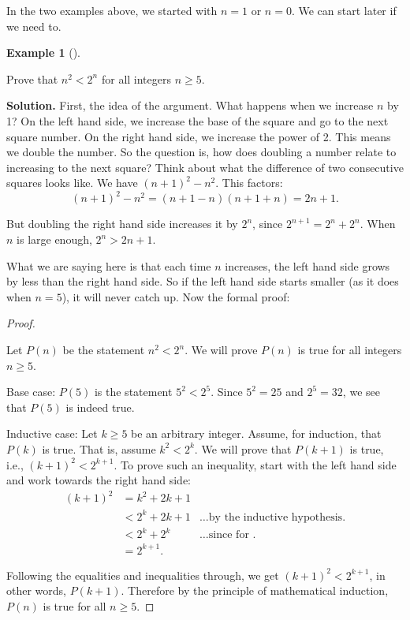 \documentclass[10pt,]{book}
\theoremstyle{plain}
\theoremstyle{definition}
\newtheorem{example}[theorem]{Example}
\theoremstyle{definition}
\theoremstyle{definition}
\numberwithin{equation}{chapter}
\newcommand{\lt}{ < }
\newcommand{\amp}{ & }
\begin{document}
In the two examples above, we started with \(n = 1\) or \(n = 0\). We can start later if we need to.
%
\begin{example}[]\label{example-81}

Prove that \(n^2 \lt  2^n\) for all integers \(n \ge 5\).
%
\par\medskip\noindent%
\textbf{Solution.}\quad
First, the idea of the argument. What happens when we increase \(n\) by 1? On the left hand side, we increase the base of the square and go to the next square number. On the right hand side, we increase the power of 2. This means we double the number. So the question is, how does doubling a number relate to increasing to the next square? Think about what the difference of two consecutive squares looks like. We have \((n+1)^2 - n^2\). This factors:
\begin{equation*}
  (n+1)^2 - n^2 = (n+1-n)(n+1+n) = 2n+1.
\end{equation*}
%
\par

But doubling the right hand side increases it by \(2^n\), since \(2^{n+1} = 2^n + 2^n\). When \(n\) is large enough, \(2^n > 2n + 1\).
%
\par

What we are saying here is that each time \(n\) increases, the left hand side grows by less than the right hand side. So if the left hand side starts smaller (as it does when \(n = 5\)), it will never catch up. Now the formal proof:
%
\begin{proof}\hypertarget{proof-16}{}

Let \(P(n)\) be the statement \(n^2 \lt  2^n\).
We will prove \(P(n)\) is true for all integers \(n \ge 5\).
%
\par

Base case: \(P(5)\) is the statement \(5^2 \lt  2^5\). Since \(5^2 = 25\) and \(2^5 = 32\), we see that \(P(5)\) is indeed true.
%
\par

Inductive case: Let \(k \ge 5\) be an arbitrary integer. Assume, for induction, that \(P(k)\) is true. That is, assume \(k^2 \lt  2^k\). We will prove that \(P(k+1)\) is true, i.e., \((k+1)^2 \lt  2^{k+1}\). To prove such an inequality, start with the left hand side and work towards the right hand side:
\begin{align*}
  (k+1)^2 \amp  = k^2 + 2k + 1 \amp\\
  \amp  \lt  2^k + 2k + 1 \amp \mbox{\ldots by the inductive hypothesis.}\\
  \amp  \lt  2^k + 2^k  \amp \mbox{\ldots since  for .}\\
  \amp  = 2^{k+1}. \amp
\end{align*}
%
\par

Following the equalities and inequalities through, we get \((k+1)^2 \lt  2^{k+1}\), in other words, \(P(k+1)\). Therefore by the principle of mathematical induction, \(P(n)\) is true for all \(n \ge 5\).
%
\end{proof}
\end{example}
\par
\end{document}

